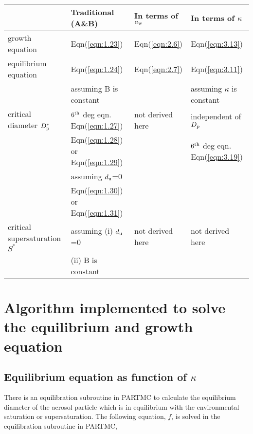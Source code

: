 \documentclass[12pt]{article}
\begin{document}
\begin{tabular}{p{2cm} p{4cm} p{4cm} p{4cm}} 
\hline
             &  Traditional (A\&B)  &   In terms of $a_{\rm w}$  &  In terms of $\kappa$ \\
\hline  \hline             
    growth equation  &  Eqn(\ref{eqn:1.23})   &   Eqn(\ref{eqn:2.6})   &    Eqn(\ref{eqn:3.13}) \\ 
\hline 
    equilibrium equation & Eqn(\ref{eqn:1.24})   &  Eqn(\ref{eqn:2.7})  &  Eqn(\ref{eqn:3.11})  \\
\hline    
              & assuming  B is constant &  &  assuming $\kappa$ is constant   \\
               critical diameter $D_{\rm p}^{*}$  &  $6^{\rm th}$ deg eqn.   Eqn(\ref{eqn:1.27}) & not derived here  &independent of $D_{\rm p}$ \\
                                                  & Eqn(\ref{eqn:1.28}) or Eqn(\ref{eqn:1.29})  &                    & $6^{\rm th}$ deg eqn. Eqn(\ref{eqn:3.19})   \\                               
  &  assuming $d_{\rm u}$=0  &    &    \\
                                                
                                               
\hline
 & Eqn(\ref{eqn:1.30}) or Eqn(\ref{eqn:1.31})  &              &                        \\
 critical supersaturation $S^{*}$   &  assuming (i) $d_{\rm u}$=0  &   not derived here  &  not derived here   \\
  & (ii) B is constant  & &  \\
\hline 
\end{tabular}

\section{Algorithm implemented to solve the equilibrium and growth equation}

\subsection{Equilibrium equation as function of $\kappa$}

There is an equilibration subroutine in PARTMC to calculate the equilibrium diameter of the aerosol particle which is in equilibrium with the environmental saturation or supersaturation.
The following equation, $f$, is solved in the equilibration subroutine in PARTMC,
\end{document}
